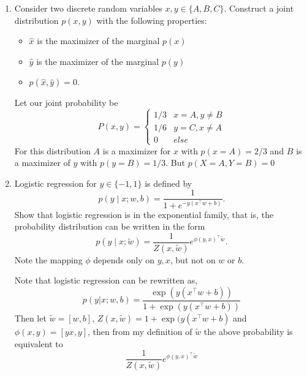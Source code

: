 \documentclass{article}
\begin{document}
\begin{enumerate}
\item
Consider two discrete random variables $x,y \in \{A,B,C\}$.
Construct a joint distribution $p(x,y)$ with the following properties:
\begin{itemize}
\item $\hat x$ is the maximizer of the marginal $p(x)$
\item $\hat y$ is the maximizer of the marginal $p(y)$
\item $p(\hat x, \hat y)=0$.
\end{itemize}
\color{blue}
Let our joint probability be 
$$
P(x,y) = 
\begin{cases}
1/3 & x = A, y \neq B \\
1/6 & y = C, x \neq A \\
0 & else
\end{cases}
$$
For this distribution $A$ is a maximizer for $x$ with $p(x = A) = 2/3$ and $B$ is a maximizer of $y$ with $p(y = B) = 1/3$. 
But $p(X = A, Y = B) = 0$
\color{black}

\item
Logistic regression for $y\in \{-1,1\}$ is defined by
$$p(y \mid x; w,b) = \frac{1}{1+e^{-y (x^\top w + b)}}.$$
Show that logistic regression is in the exponential family, that is, the probability distribution can be written in the form
$$p(y \mid x; \tilde w) = \frac{1}{Z(x,\tilde w)} e^{\phi(y,x)^\top \tilde w}.$$
Note the mapping $\phi$ depends only on $y, x$, but not on $w$ or $b$.

\color{blue}
Note that logistic regression can be rewritten as,
$$
p(y | x; w,b) = \frac{\exp(y(x^\top w + b))}{1 + \exp(y(x^\top w + b))}
$$
Then let $\tilde w = [w,b]$, $Z(x, \tilde w) = 1 + \exp(y(x^\top w + b)$ and $\phi(x,y) = [yx, y]$,
then from my definition of $\tilde w$ the above probability is equivalent to 
$$
 \frac{1}{Z(x,\tilde w)} e^{\phi(y,x)^\top \tilde w}
$$
\color{black}

\end{enumerate}
\end{document}

